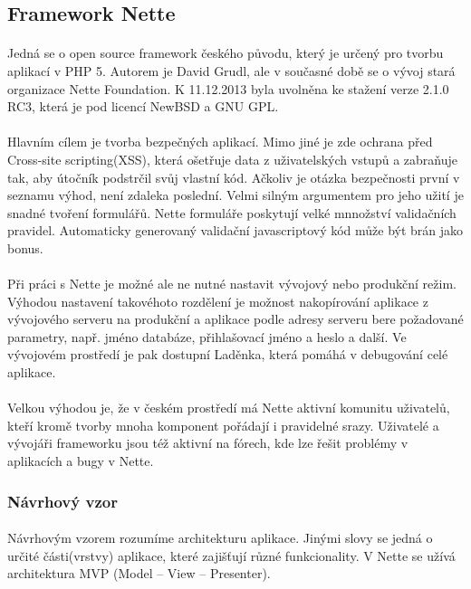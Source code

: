 \documentclass[11pt,a4paper,titlepage,oneside]{book}
\begin{document}
		\subsection{Framework Nette}
			\paragraph{} Jedná se o open source framework českého původu, který je určený pro tvorbu aplikací v PHP 5.  Autorem je David Grudl, ale v současné době se o vývoj stará organizace Nette Foundation. K 11.12.2013 byla uvolněna ke stažení verze 2.1.0 RC3, která je pod licencí NewBSD a GNU GPL.  
			\paragraph{} Hlavním cílem je tvorba bezpečných aplikací. Mimo jiné je zde ochrana před Cross-site scripting(XSS), která ošetřuje data z uživatelských vstupů a zabraňuje tak, aby útočník podstrčil svůj vlastní kód. Ačkoliv je otázka bezpečnosti první v seznamu výhod, není zdaleka poslední. Velmi silným argumentem pro jeho užití je snadné tvoření formulářů. Nette formuláře poskytují velké mnnožství validačních pravidel. Automaticky generovaný validační javascriptový kód může být brán jako bonus.
			\paragraph{} Při práci s Nette je možné ale ne nutné nastavit vývojový nebo produkční režim. Výhodou nastavení takovéhoto rozdělení je možnost nakopírování aplikace z vývojového serveru na produkční a aplikace podle adresy serveru bere požadované parametry, např. jméno databáze, přihlašovací jméno a  heslo a další. Ve vývojovém prostředí je pak dostupní Laděnka, která pomáhá v debugování celé aplikace.
			\paragraph{} Velkou výhodou je, že v českém prostředí má Nette aktivní komunitu uživatelů, kteří kromě tvorby mnoha komponent pořádají i pravidelné srazy.  Uživatelé a vývojáři frameworku jsou též aktivní na fórech, kde lze řešit problémy v aplikacích a bugy v Nette.

			\subsubsection*{Návrhový vzor}
				\paragraph{} Návrhovým vzorem rozumíme architekturu aplikace. Jinými slovy se jedná o určité části(vrstvy) aplikace, které zajišťují různé funkcionality. V Nette se užívá architektura MVP (Model -- View -- Presenter).
\end{document}
